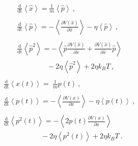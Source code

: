	\begin{multicols}{2}
		\noindent
		\begin{align*}
			\begin{split}
				&\frac{\text{d}}{\text{dt}} \left \langle \hat{x} \right \rangle =	\frac{1}{m} \left\langle \hat{p} \right \rangle~,
			\end{split}
			\\
			\begin{split}
				&\frac{\text{d}}{\text{dt}} \left \langle \hat{p} \right \rangle = - 	\left\langle  \frac{\partial V(\hat{x})}{\partial \hat{x}} \right \rangle - \eta \left \langle \hat{p} \right \rangle ~,
			\end{split}
			\\
			\begin{split}
				&\frac{\text{d}}{\text{dt}} \left \langle \hat{p}^2 \right \rangle =	- \left\langle \hat{p} \frac{\partial V(\hat{x})}{\partial \hat{x}} + \frac{\partial V(\hat{x})}{\partial \hat{x}} \hat{p} \right \rangle \\
				&\qquad \qquad ~- 2 \eta \left \langle \hat{p}^2 \right \rangle + 2 \eta k_B T ~,
			\end{split}		
		\end{align*}
		\begin{align*}
			\begin{split}
				&\frac{\text{d}}{\text{dt}} \left \langle {x}(t) \right \rangle  =	~\frac{1}{m} {p}(t) ~,
			\end{split}
			\\
			\begin{split}
				&\frac{\text{d}}{\text{dt}} \left \langle {p}(t) \right \rangle =	- 	\left \langle \frac{\partial V({x})}{\partial {x}} \right \rangle - \eta \left \langle {p}(t) \right \rangle ~,
			\end{split}
			\\
			\begin{split}
				&\frac{\text{d}}{\text{dt}} \left \langle {p}^2(t) \right \rangle = - \left\langle 2 {p}(t) \frac{\partial V({x})}{\partial {x}}\right \rangle \\
				&\qquad \qquad \quad ~ - 2 \eta \left \langle {p}^2(t) \right \rangle + 2 \eta k_B T~.
			\end{split}		
		\end{align*}
	\end{multicols}
